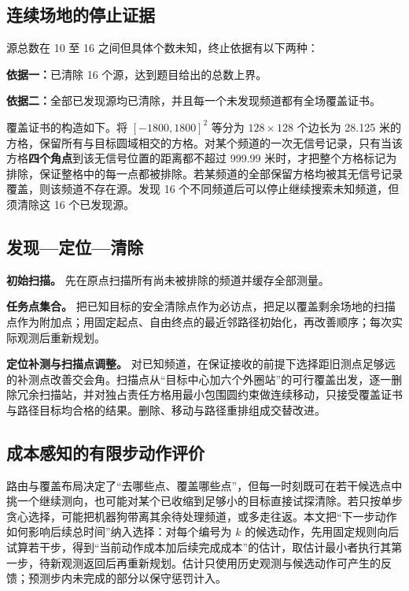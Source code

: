 \documentclass[UTF8,a4paper,zihao=-4,fontset=none]{ctexart}
\begin{document}
\subsection{连续场地的停止证据}

源总数在 10 至 16 之间但具体个数未知，终止依据有以下两种：

\textbf{依据一：}已清除 16 个源，达到题目给出的总数上界。

\textbf{依据二：}全部已发现源均已清除，并且每一个未发现频道都有全场覆盖证书。

覆盖证书的构造如下。将 \([-1800,1800]^2\) 等分为 \(128\times128\) 个边长为 28.125 米的方格，保留所有与目标圆域相交的方格。对某个频道的一次无信号记录，只有当该方格\textbf{四个角点}到该无信号位置的距离都不超过 999.99 米时，才把整个方格标记为排除，保证整格中的每一点都被排除。若某频道的全部保留方格均被其无信号记录覆盖，则该频道不存在源。发现 16 个不同频道后可以停止继续搜索未知频道，但须清除这 16 个已发现源。

\subsection{发现—定位—清除}

\textbf{初始扫描。} 先在原点扫描所有尚未被排除的频道并缓存全部测量。

\textbf{任务点集合。} 把已知目标的安全清除点作为必访点，把足以覆盖剩余场地的扫描点作为附加点；用固定起点、自由终点的最近邻路径初始化，再改善顺序；每次实际观测后重新规划。

\textbf{定位补测与扫描点调整。} 对已知频道，在保证接收的前提下选择距旧测点足够远的补测点改善交会角。扫描点从“目标中心加六个外圈站”的可行覆盖出发，逐一删除冗余扫描站，并对独占责任方格用最小包围圆约束做连续移动，只接受覆盖证书与路径目标均合格的结果。删除、移动与路径重排组成交替改进。

\subsection{成本感知的有限步动作评价}

路由与覆盖布局决定了“去哪些点、覆盖哪些点”，但每一时刻既可在若干候选点中挑一个继续测向，也可能对某个已收缩到足够小的目标直接试探清除。若只按单步贪心选择，可能把机器狗带离其余待处理频道，或多走往返。本文把“下一步动作如何影响后续总时间”纳入选择：对每个编号为 \(k\) 的候选动作，先用固定规则向后试算若干步，得到“当前动作成本加后续完成成本”的估计，取估计最小者执行其第一步，待新观测返回后再重新规划。估计只使用历史观测与候选动作可产生的反馈；预测步内未完成的部分以保守惩罚计入。
\end{document}
